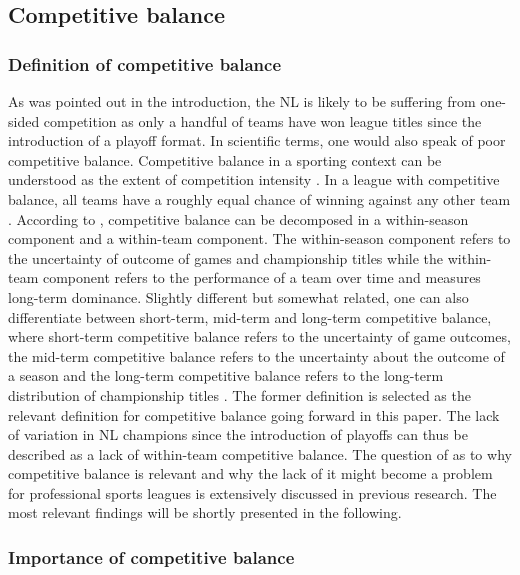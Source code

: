 \documentclass[12pt, a4paper]{article}
\begin{document}
\subsection{Competitive balance}
\label{competitiveBalance}

\subsubsection{Definition of competitive balance}
\label{competitiveBalanceDefinition}

As was pointed out in the introduction, the NL is likely to be suffering from one-sided competition as only a handful of teams have won league titles since the introduction of a playoff format. In scientific terms, one would also speak of poor competitive balance. Competitive balance in a sporting context can be understood as the extent of competition intensity \citep{walzel_teamsport_2019}. In a league with competitive balance, all teams have a roughly equal chance of winning against any other team \citep{szymanski_economic_2003}. According to \citet{sanderson_many_2002}, competitive balance can be decomposed in a within-season component and a within-team component. The within-season component refers to the uncertainty of outcome of games and championship titles while the within-team component refers to the performance of a team over time and measures long-term dominance. Slightly different but somewhat related, one can also differentiate between short-term, mid-term and long-term competitive balance, where short-term competitive balance refers to the uncertainty of game outcomes, the mid-term competitive balance refers to the uncertainty about the outcome of a season and the long-term competitive balance refers to the long-term distribution of championship titles \citep{walzel_teamsport_2019}. The former definition is selected as the relevant definition for competitive balance going forward in this paper. The lack of variation in NL champions since the introduction of playoffs can thus be described as a lack of within-team competitive balance. The question of as to why competitive balance is relevant and why the lack of it might become a problem for professional sports leagues is extensively discussed in previous research. The most relevant findings will be shortly presented in the following.

\subsubsection{Importance of competitive balance}
\label{competitiveBalanceImportance}
\end{document}
